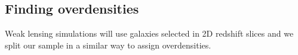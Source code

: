 \documentclass[twocolumn,useAMS,usenatbib]{mn2e}
\newcommand{\rachel}[1]{{\textcolor{red}{#1}}}
\begin{document}

\subsection{Finding overdensities}
\label{sub:overdensities}


Weak lensing simulations will use galaxies selected in 2D redshift slices and
we split our sample in a similar way to assign overdensities.

\end{document}
